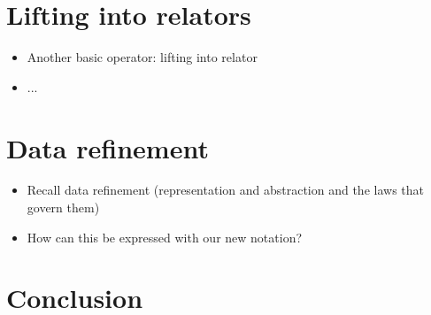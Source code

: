 \documentclass[runningheads,a4paper]{llncs}
\begin{document}
\section{Lifting into relators}

\begin{itemize}
\item Another basic operator: lifting into relator
\item ...
\end{itemize}

\section{Data refinement}

\begin{itemize}
\item Recall data refinement (representation and abstraction and the laws that govern them)
\item How can this be expressed with our new notation?
\end{itemize}

\section{Conclusion}



\end{document}
